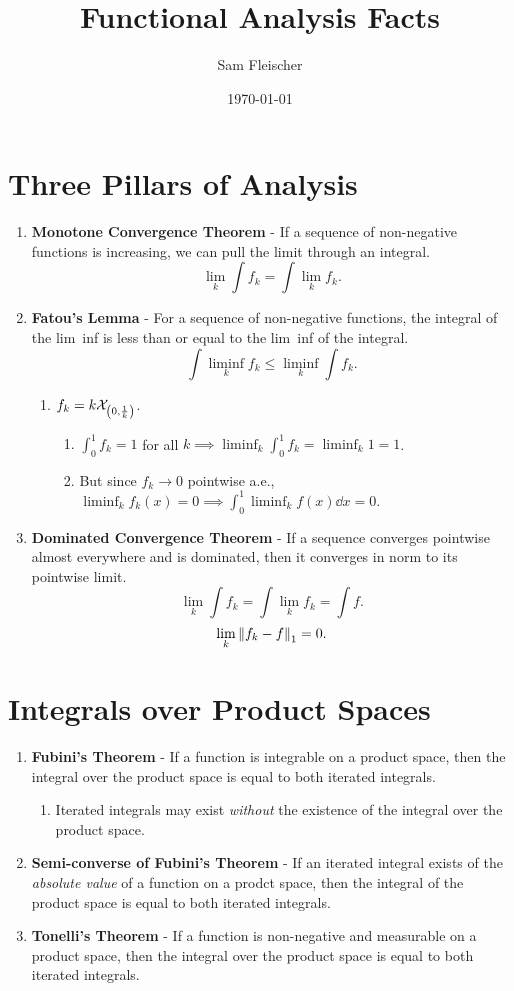 \documentclass{article}
\title{Functional Analysis Facts}
\author{Sam Fleischer}
\date{\today}
\begin{document}
    \maketitle
    \section{Three Pillars of Analysis}
    \begin{enumerate}
        \item \textbf{Monotone Convergence Theorem} - If a sequence of non-negative functions is increasing, we can pull the limit through an integral. $$\lim_k \int f_k = \int \lim_k f_k.$$
        \item \textbf{Fatou's Lemma} - For a sequence of non-negative functions, the integral of the lim~inf is less than or equal to the lim~inf of the integral. $$\int \liminf_k f_k \leq \liminf_k \int f_k.$$
        \begin{enumerate}
            \item $f_k = k\mathcal{X}_{\qty(0, \frac{1}{k})}$.
            \begin{enumerate}
                \item $\int_0^1 f_k = 1$ for all $k \implies \liminf_k \int_0^1 f_k = \liminf_k 1 = 1$.
                \item But since $f_k \rightarrow 0$ pointwise a.e., $\liminf_k f_k(x) = 0 \implies \int_0^1 \liminf_k f(x) \dd x = 0$.
            \end{enumerate}
        \end{enumerate}
        \item \textbf{Dominated Convergence Theorem} - If a sequence converges pointwise almost everywhere and is dominated, then it converges in norm to its pointwise limit.  $$\lim_k\int f_k = \int \lim_k f_k = \int f.$$  $$\lim_k\norm{f_k - f}_1 = 0.$$
    \end{enumerate}

    \section{Integrals over Product Spaces}
    \begin{enumerate}
        \item \textbf{Fubini's Theorem} - If a function is integrable on a product space, then the integral over the product space is equal to both iterated integrals.
        \begin{enumerate}
            \item Iterated integrals may exist \emph{without} the existence of the integral over the product space.
        \end{enumerate}
        \item \textbf{Semi-converse of Fubini's Theorem} - If an iterated integral exists of the \emph{absolute value} of a function on a prodct space, then the integral of the product space is equal to both iterated integrals.
        \item \textbf{Tonelli's Theorem} - If a function is non-negative and measurable on a product space, then the integral over the product space is equal to both iterated integrals.
    \end{enumerate}
\end{document}
